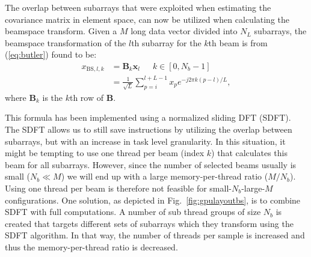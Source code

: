 \documentclass[journal]{IEEEtran}
\newcommand{\mat}[1]{\mathbf{#1}}
\renewcommand{\vec}[1]{\mathbf{#1}}
\begin{document}
The overlap between subarrays that were exploited when estimating the covariance matrix in element space, can now be utilized when calculating the beamspace transform. 
Given a $M$ long data vector divided into $N_L$ subarrays, the beamspace transformation of the $l$th subarray for the $k$th beam is from (\ref{eq:butler}) found to be:
\begin{align}\label{eq:bs_formula}
x_{\text{BS},l,k} &= \mat{B}_k\vec{x}_l \,\,\,\,\,\,\,\,\, k \in [0, N_b-1] \\
&= \frac{1}{\sqrt{L}}\sum_{p=i}^{l+L-1}x_p e^{-j2\pi k(p-l)/L},
\end{align}
where $\mat{B}_k$ is the $k$th row of $\mat{B}$. %

This formula has been implemented using a normalized sliding DFT (SDFT)\cite{Lyons2003}.
The SDFT allows us to still save instructions by utilizing the overlap between subarrays, but with an increase in task level granularity. In this situation, it might be tempting to use one thread per beam (index $k$) that calculates this beam for all subarrays. However, since the number of selected beams usually is small ($N_b \ll M$) we will end up with a large memory-per-thread ratio ($M/N_b$). Using one thread per beam is therefore not feasible for small-$N_b$-large-$M$ configurations. One solution, as depicted in Fig.\ \ref{fig:gpulayoutbs}, is to combine SDFT with full computations. A number of sub thread groups of size $N_b$ is created that targets different sets of subarrays which they transform using the SDFT algorithm. In that way, the number of threads per sample is increased and thus the memory-per-thread ratio is decreased. 
\end{document}
